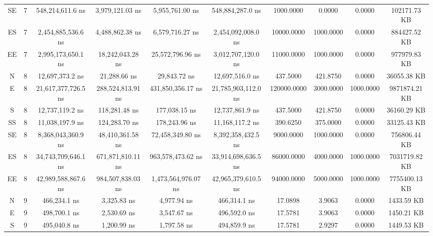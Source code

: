 \begin{sidewaystable}
\begin{tabular}{|c|c|c|c|c|c|c|c|c|c|}
        SE     & 7     & 548,214,611.6 ns    & 3,979,121.03 ns   & 5,955,761.00 ns     & 548,884,287.0 ns    & 1000.0000   & 0.0000    & 0.0000    & 102171.73 KB  \\
        ES     & 7     & 2,454,885,536.6 ns  & 4,488,862.38 ns   & 6,579,716.27 ns     & 2,454,092,008.0 ns  & 10000.0000  & 1000.0000 & 0.0000    & 884427.52 KB  \\
        EE     & 7     & 2,995,173,650.1 ns  & 18,242,043.28 ns  & 25,572,796.96 ns    & 3,012,707,120.0 ns  & 11000.0000  & 1000.0000 & 0.0000    & 977979.83 KB  \\
        N      & 8     & 12,697,373.2 ns     & 21,288.66 ns      & 29,843.72 ns        & 12,697,516.0 ns     & 437.5000    & 421.8750  & 0.0000    & 36055.38 KB   \\
        E      & 8     & 21,617,377,726.5 ns & 288,524,813.91 ns & 431,850,356.17 ns   & 21,785,903,112.0 ns & 120000.0000 & 3000.0000 & 1000.0000 & 9871874.21 KB \\
        S      & 8     & 12,737,119.2 ns     & 118,281.48 ns     & 177,038.15 ns       & 12,737,861.9 ns     & 437.5000    & 421.8750  & 0.0000    & 36160.29 KB   \\
        SS     & 8     & 11,038,197.9 ns     & 124,283.70 ns     & 178,243.96 ns       & 11,168,117.2 ns     & 390.6250    & 375.0000  & 0.0000    & 33125.43 KB   \\
        SE     & 8     & 8,368,043,360.9 ns  & 48,410,361.58 ns  & 72,458,349.80 ns    & 8,392,358,432.5 ns  & 9000.0000   & 1000.0000 & 0.0000    & 756806.44 KB  \\
        ES     & 8     & 34,743,709,646.1 ns & 671,871,810.11 ns & 963,578,473.62 ns   & 33,914,698,636.5 ns & 86000.0000  & 4000.0000 & 1000.0000 & 7031719.82 KB \\
        EE     & 8     & 42,989,588,867.6 ns & 984,507,838.03 ns & 1,473,564,976.07 ns & 42,965,379,610.5 ns & 94000.0000  & 5000.0000 & 1000.0000 & 7755400.13 KB \\
        N      & 9     & 466,234.1 ns        & 3,325.83 ns       & 4,977.94 ns         & 466,314.1 ns        & 17.0898     & 3.9063    & 0.0000    & 1433.59 KB    \\
        E      & 9     & 498,700.1 ns        & 2,530.69 ns       & 3,547.67 ns         & 496,592.0 ns        & 17.5781     & 3.9063    & 0.0000    & 1450.21 KB    \\
        S      & 9     & 495,040.8 ns        & 1,200.99 ns       & 1,797.58 ns         & 494,859.9 ns        & 17.5781     & 2.9297    & 0.0000    & 1449.53 KB    \\

\end{tabular}
\end{sidewaystable}

